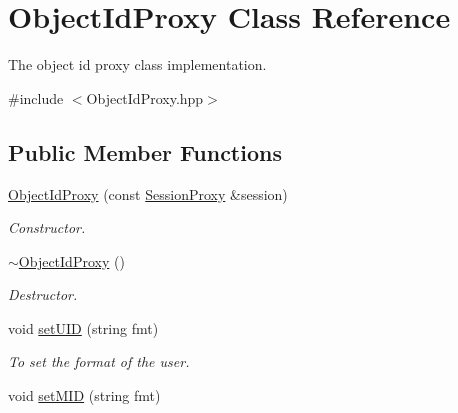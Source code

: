 \hypertarget{classObjectIdProxy}{
\section{ObjectIdProxy Class Reference}
\label{classObjectIdProxy}
}


The object id proxy class implementation.  




{\ttfamily \#include $<$ObjectIdProxy.hpp$>$}

\subsection*{Public Member Functions}
\begin{DoxyCompactItemize}
\item 
\hyperlink{classObjectIdProxy_afd4fa0f4384fd815b9dbd3925e5fc3e4}{ObjectIdProxy} (const \hyperlink{classSessionProxy}{SessionProxy} \&session)
\begin{DoxyCompactList}\small\item\em Constructor. \item\end{DoxyCompactList}\item 
\hypertarget{classObjectIdProxy_ad6d666d7f660292c958707c3f7a5ad6f}{
\hyperlink{classObjectIdProxy_ad6d666d7f660292c958707c3f7a5ad6f}{$\sim$ObjectIdProxy} ()}
\label{classObjectIdProxy_ad6d666d7f660292c958707c3f7a5ad6f}

\begin{DoxyCompactList}\small\item\em Destructor. \item\end{DoxyCompactList}\item 
\hypertarget{classObjectIdProxy_aa1fc9166d7c25e846cd0a1606393d099}{
void \hyperlink{classObjectIdProxy_aa1fc9166d7c25e846cd0a1606393d099}{setUID} (string fmt)}
\label{classObjectIdProxy_aa1fc9166d7c25e846cd0a1606393d099}

\begin{DoxyCompactList}\small\item\em To set the format of the user. \item\end{DoxyCompactList}\item 
\hypertarget{classObjectIdProxy_aa64809600dbf8bcc14f22564d8a358cb}{
void \hyperlink{classObjectIdProxy_aa64809600dbf8bcc14f22564d8a358cb}{setMID} (string fmt)}
\label{classObjectIdProxy_aa64809600dbf8bcc14f22564d8a358cb}


\end{DoxyCompactItemize}
